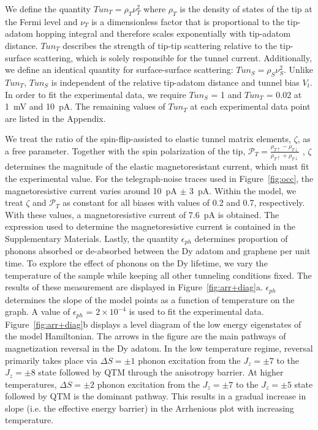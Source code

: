\documentclass[
reprint,amsmath,amssymb,aps]{revtex4-2}
\begin{document}
We define the quantity $Tun_{T} = \rho_{T} \nu^{2}_{T}$ where $\rho_{T}$ is the density of states of the tip at the Fermi level and $\nu_{T}$ is a dimensionless factor that is proportional to the tip-adatom hopping integral and therefore scales exponentially with tip-adatom distance. $Tun_{T}$ describes the strength of tip-tip scattering relative to the tip-surface scattering, which is solely responsible for the tunnel current. Additionally, we define an identical quantity for surface-surface scattering: $Tun_{S} = \rho_{S} \nu^{2}_{S}$. Unlike $Tun_{T}$, $Tun_{S}$ is independent of the relative tip-adatom distance and tunnel bias $V_{t}$. In order to fit the experimental data, we require $Tun_{S}$ = 1 and $Tun_{T}$ = 0.02 at 1~mV and 10~pA. The remaining values of $Tun_{T}$ at each experimental data point are listed in the Appendix.\par
We treat the ratio of the spin-flip-assisted to elastic tunnel matrix elements, $\zeta$, as a free parameter. Together with the spin polarization of the tip, $\mathcal{P}_{T} =\frac{\rho_{T \uparrow} - \rho_{T \downarrow}}{\rho_{T \uparrow} + \rho_{T\downarrow}}$ , $\zeta$ determines the magnitude of the elastic magnetoresistant current, which must fit the experimental value. For the telegraph-noise traces used in Figure~\ref{fig:occ}, the magnetoresistive current varies around 10~pA $\pm$ 3~pA. Within the model, we treat $\zeta$ and $\mathcal{P}_{T}$ as constant for all biases with values of 0.2 and 0.7, respectively. With these values, a magnetoresistive current of 7.6~pA is obtained. The expression used to determine the magnetoresistive current is contained in the Supplementary Materials.
Lastly, the quantity $\epsilon_{ph}$ determines proportion of phonons absorbed or de-absorbed between the Dy adatom and graphene per unit time. To explore the effect of phonons on the Dy lifetime, we vary the temperature of the sample while keeping all other tunneling conditions fixed. The results of these measurement are displayed in Figure~\ref{fig:arr+diag}a. $\epsilon_{ph}$ determines the slope of the model points as a function of temperature on the graph. A value of $\epsilon_{ph}$ = $2 \times 10^{-4}$ is used to fit the experimental data.
Figure~\ref{fig:arr+diag}b displays a level diagram of the low energy eigenstates of the model Hamiltonian. The arrows in the figure are the main pathways of magnetization reversal in the Dy adatom. In the low temperature regime, reversal primarily takes place via $\Delta S = \pm 1$  phonon excitation from the $J_{z} = \pm 7$ to the $J_{z} = \pm 8$ state followed by QTM through the anisotropy barrier. At higher temperatures, $\Delta S = \pm 2$ phonon excitation from the $J_{z} = \pm 7$ to the $J_{z} = \pm 5$ state followed by QTM is the dominant pathway. This results in a gradual increase in slope (i.e. the effective energy barrier) in the Arrhenious plot with increasing temperature. 
\end{document}
